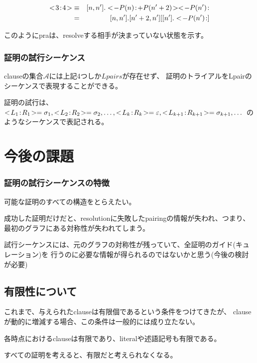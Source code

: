 \documentclass[10pt, onecolumn]{jarticle}   	%
\begin{document}
\begin{eqnarray}
\unify{3}{4} &\equiv& \binding{n,n'}.\unify{-P(n)}{+P(n'+2)}\pra{-P(n')}\\
&=&\binding{n,n'}.\tuple{n'+2,n'} [\binding{n'}.\pra{-P(n')}]
\end{eqnarray}

このようにpraは、resolveする相手が決まっていない状態を示す。

\subsubsection{証明の試行シーケンス}
clauseの集合$\mathcal{A}$には上記4つしか$Lpairs$が存在せず、
証明のトライアルをLpairのシーケンスで表現することができる。

証明の試行は、$\unify{L_1}{R_1}=\sigma_1,\unify{L_2}{R_2}=\sigma_2,\dots,\unify{L_k}{R_k}=\Fail,\unify{L_{k+1}}{R_{k+1}}=\sigma_{k+1},\dots$
のようなシーケンスで表記される。



\section{今後の課題}

\subsubsection{証明の試行シーケンスの特徴}
可能な証明のすべての構造をとらえたい。

成功した証明だけだと、resolutionに失敗したpairingの情報が失われ、つまり、
最初のグラフにある対称性が失われてしまう。

試行シーケンスには、元のグラフの対称性が残っていて、全証明のガイド(キュレーション)を
行うのに必要な情報が得られるのではないかと思う(今後の検討が必要)

\subsection{有限性について}
これまで、与えられたclauseは有限個であるという条件をつけてきたが、
clauseが動的に増減する場合、この条件は一般的には成り立たない。

各時点におけるclauseは有限であり、literalや述語記号も有限である。

すべての証明を考えると、有限だと考えられなくなる。
\end{document}

